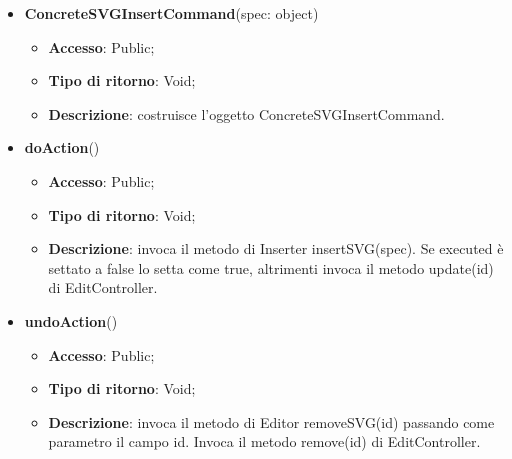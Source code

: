 {{{	
	\begin{itemize}
		\item \textbf{ConcreteSVGInsertCommand}(spec: object)
		\begin{itemize}
			\item \textbf{Accesso}: Public;
			\item \textbf{Tipo di ritorno}: Void;
			\item \textbf{Descrizione}: costruisce l’oggetto ConcreteSVGInsertCommand.
		\end{itemize}
		\item \textbf{doAction}()
		\begin{itemize}
			\item \textbf{Accesso}: Public;
			\item \textbf{Tipo di ritorno}: Void;
			\item \textbf{Descrizione}: invoca il metodo di Inserter insertSVG(spec). Se executed è settato a false lo setta come true, altrimenti invoca il metodo update(id) di EditController.
		\end{itemize}
		\item \textbf{undoAction}()
		\begin{itemize}
			\item \textbf{Accesso}: Public;
			\item \textbf{Tipo di ritorno}: Void;
			\item \textbf{Descrizione}: invoca il metodo di Editor removeSVG(id) passando come parametro il campo id. Invoca il metodo remove(id) di EditController.
		\end{itemize}
	\end{itemize}
	}
}}
